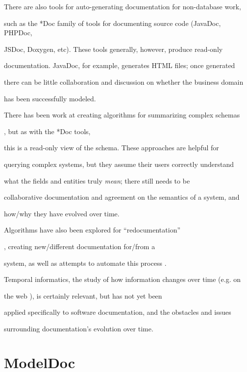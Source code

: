 \documentclass{acm_proc_article-sp}
\begin{document}
There are also tools for auto-generating documentation for non-database work,

such as the *Doc family of tools for documenting source code (JavaDoc, PHPDoc,

JSDoc, Doxygen, etc).  These tools generally, however, produce read-only

documentation.  JavaDoc, for example, generates HTML files; once generated

there can be little collaboration and discussion on whether the business domain

has been successfully modeled.



There has been work at creating algorithms for summarizing complex schemas

\cite{jag:summarization} \cite{yang:summarizing}, but as with the *Doc tools,

this is a read-only view of the schema.  These approaches are helpful for

querying complex systems, but they assume their users correctly understand

what the fields and entities truly \textit{mean}; there still needs to be

collaborative documentation and agreement on the semantics of a system, and

how/why they have evolved over time.



Algorithms have also been explored for ``redocumentation''

\cite{rajlich:webredoc}, creating new/different documentation for/from a

system, as well as attempts to automate this process \cite{anquetil:atool}.



Temporal informatics, the study of how information changes over time (e.g. on

the web \cite{adar:zoetrope}), is certainly relevant, but has not yet been

applied specifically to software documentation, and the obstacles and issues

surrounding documentation's evolution over time.



\section{ModelDoc}
\end{document}

